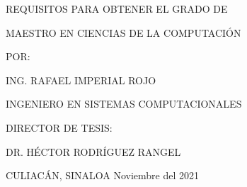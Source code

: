 \begin{titlepage}
\begin{center}
        \vspace{-0.2cm}
        
        {\fontsize{11}{30}\selectfont {} REQUISITOS PARA OBTENER EL GRADO DE}
        
        \vspace{0.5cm}
        {\fontsize{14}{30}\selectfont MAESTRO EN CIENCIAS DE LA COMPUTACIÓN}
        
        
        \vspace{0.5cm}
        
        {\fontsize{14}{30}\selectfont POR:}
        
        \vspace{0.5cm}
        {\fontsize{13}{30}\selectfont ING. RAFAEL IMPERIAL ROJO}
        
        
        {\fontsize{14}{30}\selectfont INGENIERO EN SISTEMAS COMPUTACIONALES }
        
        
        \vspace{0.5cm}
        {\fontsize{14}{30}\selectfont DIRECTOR DE TESIS:}
        
        {\fontsize{13}{30}\selectfont DR. HÉCTOR RODRÍGUEZ RANGEL}
        
        \vspace{2.5cm}
        {\fontsize{14}{30}\selectfont CULIACÁN, SINALOA} \hfill {\fontsize{14}{30}\selectfont Noviembre del 2021}
        
        
    \end{center}

\end{titlepage}